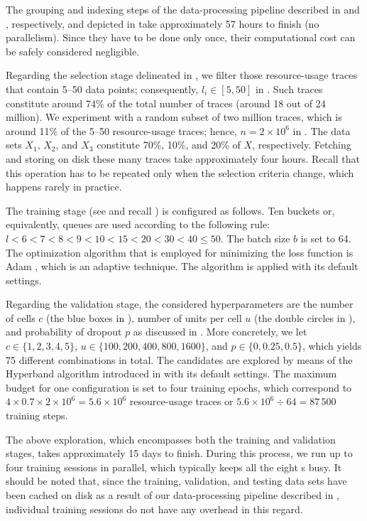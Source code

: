 The grouping and indexing steps of the data-processing pipeline described in
 and , respectively, and depicted in
 take approximately 57 hours to finish (no parallelism). Since
they have to be done only once, their computational cost can be safely
considered negligible.

Regarding the selection stage delineated in , we filter those
resource-usage traces that contain 5--50 data points; consequently, $l_i \in [5,
50]$ in . Such traces constitute around 74\% of the total number of
traces (around 18 out of 24 million). We experiment with a random subset of two
million traces, which is around 11\% of the 5--50 resource-usage traces; hence,
$n = 2 \times 10^6$ in . The data sets $X_1$, $X_2$, and $X_3$
constitute 70\%, 10\%, and 20\% of $X$, respectively. Fetching and storing on
disk these many traces take approximately four hours. Recall that this operation
has to be repeated only when the selection criteria change, which happens rarely
in practice.


The training stage (see  and recall ) is
configured as follows. Ten buckets or, equivalently, queues are used according
to the following rule: $l < 6 < 7 < 8 < 9 < 10 < 15 < 20 < 30 < 40 \leq 50$. The
batch size $b$ is set to 64. The optimization algorithm that is employed for
minimizing the loss function is Adam \cite{kingma2014}, which is an adaptive
technique. The algorithm is applied with its default settings.

Regarding the validation stage, the considered hyperparameters are the number of
cells $c$ (the blue boxes in ), number of units per cell $u$ (the
double circles in ), and probability of dropout $p$ as discussed in
. More concretely, we let $c \in \{1, 2, 3, 4, 5\}$, $u \in
\{100, 200, 400, 800, 1600\}$, and $p \in \{0, 0.25, 0.5\}$, which yields 75
different combinations in total. The candidates are explored by means of the
Hyperband algorithm introduced in  with its default settings.
The maximum budget for one configuration is set to four training epochs, which
correspond to $4 \times 0.7 \times 2 \times 10^6 = 5.6 \times 10^6$
resource-usage traces or $5.6 \times 10^6 \div 64 = 87\,500$ training steps.

The above exploration, which encompasses both the training and validation
stages, takes approximately 15 days to finish. During this process, we run up to
four training sessions in parallel, which typically keeps all the eight
s busy. It should be noted that, since the training, validation, and
testing data sets have been cached on disk as a result of our data-processing
pipeline described in , individual training sessions do not have any
overhead in this regard.


